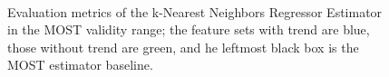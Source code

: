 \documentclass[a4paper]{book}
\begin{document}
\begin{figure}[h]
\hfill
{}\\

    \caption{Evaluation metrics of the k-Nearest Neighbors Regressor Estimator in the MOST validity range; the feature sets with trend are blue, those without trend are green, and he leftmost black box is the MOST estimator baseline.}
	\label{fig:knn_results_most}
\end{figure}
\end{document}
